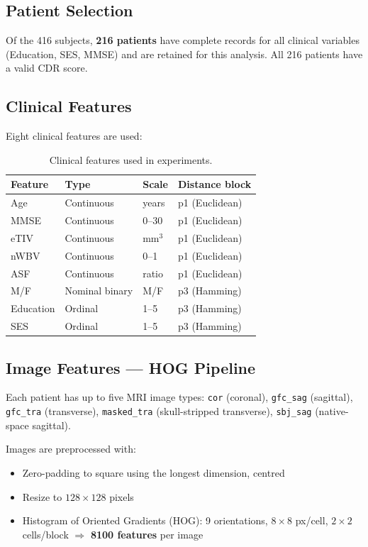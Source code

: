 \documentclass[12pt, a4paper]{article}
\begin{document}
\subsection{Patient Selection}
Of the 416 subjects, \textbf{216 patients} have complete records for all clinical variables
(Education, SES, MMSE) and are retained for this analysis. All 216 patients have a valid
CDR score.

\subsection{Clinical Features}
Eight clinical features are used:

\begin{table}[H]
\centering
\caption{Clinical features used in experiments.}
\begin{tabular}{llll}
\toprule
\textbf{Feature} & \textbf{Type} & \textbf{Scale} & \textbf{Distance block} \\
\midrule
Age & Continuous & years & p1 (Euclidean) \\
MMSE & Continuous & 0--30 & p1 (Euclidean) \\
eTIV & Continuous & mm$^3$ & p1 (Euclidean) \\
nWBV & Continuous & 0--1 & p1 (Euclidean) \\
ASF & Continuous & ratio & p1 (Euclidean) \\
\midrule
M/F & Nominal binary & M/F & p3 (Hamming) \\
Education & Ordinal & 1--5 & p3 (Hamming) \\
SES & Ordinal & 1--5 & p3 (Hamming) \\
\bottomrule
\end{tabular}
\end{table}

\subsection{Image Features — HOG Pipeline}
Each patient has up to five MRI image types:
\texttt{cor} (coronal), \texttt{gfc\_sag} (sagittal), \texttt{gfc\_tra} (transverse),
\texttt{masked\_tra} (skull-stripped transverse), \texttt{sbj\_sag} (native-space sagittal).

Images are preprocessed with:
\begin{itemize}[noitemsep]
    \item Zero-padding to square using the longest dimension, centred
    \item Resize to $128 \times 128$ pixels
    \item Histogram of Oriented Gradients (HOG): 9 orientations, $8 \times 8$ px/cell,
          $2 \times 2$ cells/block $\Rightarrow$ \textbf{8100 features} per image
\end{itemize}
\end{document}
